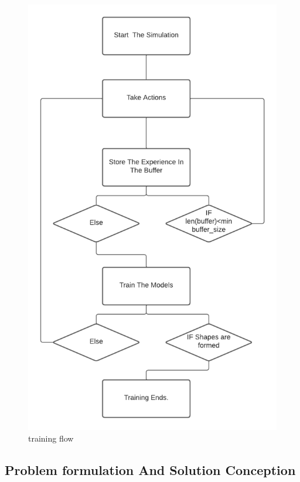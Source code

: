 \documentclass[12pt]{extarticle}
\begin{document}
 \begin{figure}[h]  
\centering
\includegraphics[scale=0.9]{training_workflow3}
\caption[training flow]{training flow}
\end{figure}


\newpage
\pagebreak
\hspace{0pt}
\vfill
\begin{center}
\section{Problem formulation And Solution Conception}
\end{center}
\vfill
\hspace{0pt}
\end{document}
